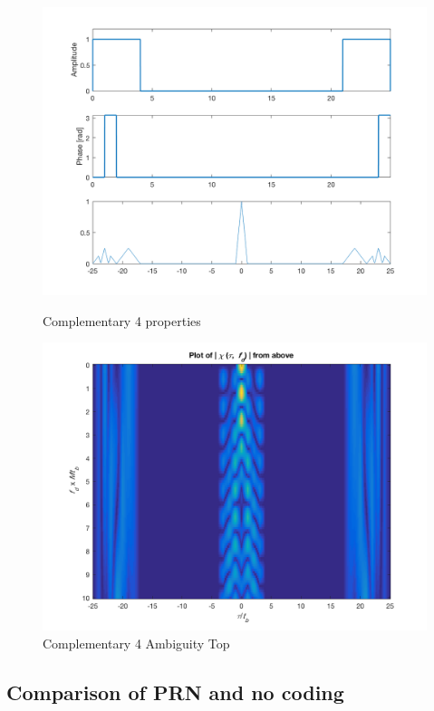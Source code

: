 \begin{figure}
    \begin{minipage}[b]{0.45\textwidth}
    \includegraphics[width=\textwidth]{images/compl4_props}
    \caption{Complementary 4 properties}
    \label{fig:compl4_prop}
  \end{minipage}
 \hfill
  \begin{minipage}[b]{0.45\textwidth}
    \includegraphics[width=\textwidth]{images/compl4_top}
    \caption{Complementary 4 Ambiguity Top}
    \label{fig:compl4_top}
  \end{minipage}
\end{figure}



\subsection{Comparison of PRN and no coding}

